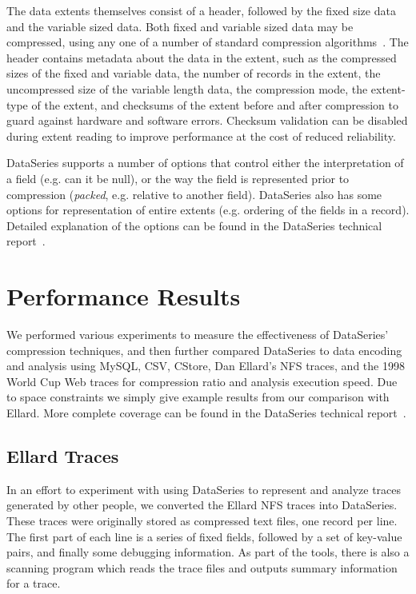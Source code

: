 \documentclass{acm_proc_article-sp}
\begin{document}
The data extents themselves consist of a header, followed by the fixed
size data and the variable sized data.  Both fixed and variable sized
data may be compressed, using any one of a number of standard
compression algorithms~\cite{GZIP,BZIP,LZF,LZO}.  The header contains
metadata about the data in the extent, such as the compressed sizes of
the fixed and variable data, the number of records in the extent, the
uncompressed size of the variable length data, the compression mode,
the extent-type of the extent, and checksums of the extent before and
after compression to guard against hardware and software errors.
Checksum validation can be disabled during extent reading to improve
performance at the cost of reduced reliability.

DataSeries supports a number of options that control either the
interpretation of a field (e.g. can it be null), or the way the field
is represented prior to compression ({\em packed}, e.g. relative to
another field).  DataSeries also has some options for representation
of entire extents (e.g. ordering of the fields in a record).  
Detailed explanation of the options can be found in the DataSeries
technical report~\cite{DSTechnicalReportSnapshot}.

\section{Performance Results}\label{sec:results}

We performed various experiments to measure the effectiveness of
DataSeries' compression techniques, and then further compared
DataSeries to data encoding and analysis using MySQL, CSV, CStore,
Dan Ellard's NFS traces\cite{ellard03}, and the 1998 World Cup Web
traces\cite{ita-wcweb98} for compression ratio and analysis execution speed.
Due to space constraints we simply give example results from our
comparison with Ellard.  More complete coverage can be found in the
DataSeries technical report~\cite{DSTechnicalReportSnapshot}.

\subsection{Ellard Traces}\label{sec:ellard}

In an effort to experiment with using DataSeries to represent and
analyze traces generated by other people, we converted the Ellard NFS
traces into DataSeries.  These traces
were originally stored as compressed text files, one record per line.
The first part of each line is a series of fixed fields, followed by a
set of key-value pairs, and finally some debugging information.  As
part of the tools, there is also a scanning program which reads the
trace files and outputs summary information for a trace.
\end{document}
